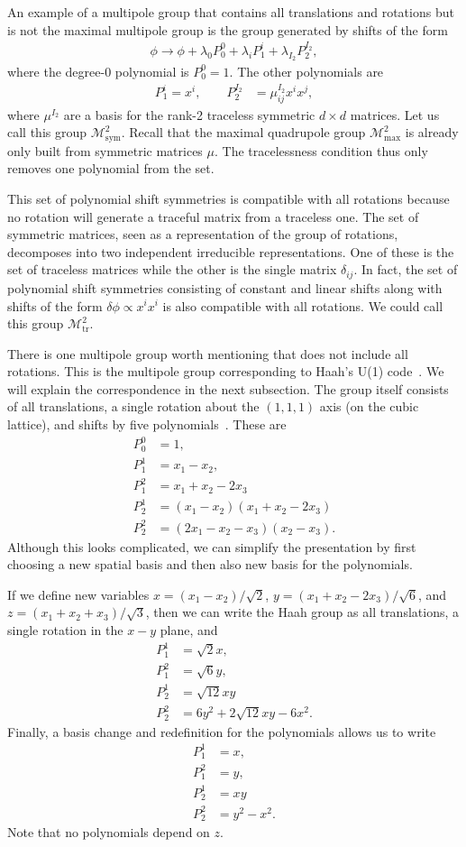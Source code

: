 \documentclass[twocolumn, longbibliography]{revtex4-2}
\newcommand{\nn}{\nonumber\\}
\newcommand{\goesto}{\rightarrow}
\begin{document}
An example of a multipole group that contains all translations and rotations but is not the maximal multipole group is the group generated by shifts of the form
\begin{align}
\phi \goesto \phi + \lambda_0 P_0^0 + \lambda_{i} P^{i}_1 + \lambda_{I_2} P^{I_2}_2,
\end{align}
where the degree-0 polynomial is $P_0^0=1$. The other polynomials are
\begin{align}
P_1^{i} = x^i,\quad \quad P_2^{I_2} &= \mu^{I_2}_{ij} x^i x^j,
\end{align}
where $\mu^{I_2}$ are a basis for the rank-2 traceless symmetric $d\times d$ matrices. Let us call this group $\mathcal{M}^2_{\text{sym}}$. Recall that the maximal quadrupole group $\mathcal{M}^2_{\text{max}}$ is already only built from symmetric matrices $\mu$. The tracelessness condition thus only removes one polynomial from the set. 

This set of polynomial shift symmetries is compatible with all rotations because no rotation will generate a traceful matrix from a traceless one. The set of symmetric matrices, seen as a representation of the group of rotations, decomposes into two independent irreducible representations. One of these is the set of traceless matrices while the other is the single matrix $\delta_{ij}$. In fact, the set of polynomial shift symmetries consisting of constant and linear shifts along with shifts of the form $\delta \phi \propto x^ix^i$ is also compatible with all rotations. We could call this group $\mathcal{M}^2_\text{tr}$.

There is one multipole group worth mentioning that does not include all rotations. This is the multipole group corresponding to Haah's U(1) code~\cite{Haah2017, BB, Gromov2019}. We will explain the correspondence in the next subsection. The group itself consists of all translations, a single rotation about the $(1,1,1)$ axis (on the cubic lattice), and shifts by five polynomials~\cite{Gromov2019}. These are
\begin{align}
P_0^0 &= 1, \nn
P_1^1 &= x_1 - x_2,\nn
P_1^2 &= x_1 + x_2 - 2x_3\nn
P_2^1 &= (x_1 - x_2) (x_1 + x_2 - 2x_3)\nn
P_2^2 &= (2x_1 - x_2 - x_3) (x_2 - x_3).
\end{align}
Although this looks complicated, we can simplify the presentation by first choosing a new spatial basis and then also new basis for the polynomials.

If we define new variables $x = (x_1 - x_2)/\sqrt{2}$, $y = (x_1 + x_2 - 2x_3)/\sqrt{6}$, and $z = (x_1 + x_2 + x_3)/\sqrt{3}$, then we can write the Haah group as all translations, a single rotation in the $x-y$ plane, and
\begin{align}
P_1^1 &= \sqrt{2} x , \nn
P_1^2 &= \sqrt{6} y, \nn
P_2^1 &= \sqrt{12} xy\nn
P_2^2 &= 6y^2 +2\sqrt{12} xy - 6x^2.
\end{align}
Finally, a basis change and redefinition for the polynomials allows us to write
\begin{align}
P_1^1 &= x , \nn
P_1^2 &= y, \nn
P_2^1 &= xy\nn
P_2^2 &= y^2 - x^2.
\end{align}
Note that no polynomials depend on $z$.
\end{document}
